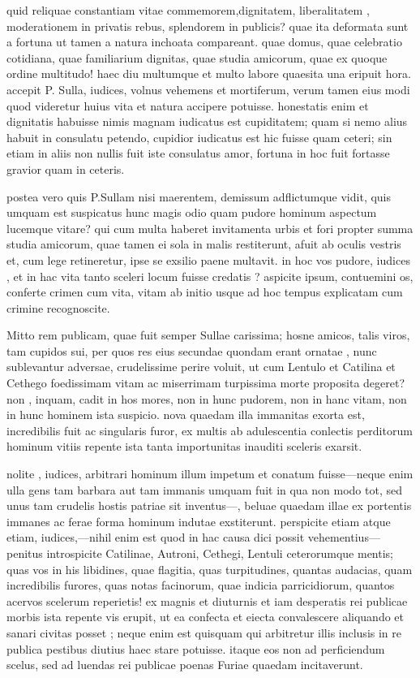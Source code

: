 quid reliquae constantiam vitae commemorem,dignitatem, liberalitatem , moderationem in privatis rebus, splendorem in publicis? quae ita deformata sunt a fortuna ut tamen a natura inchoata compareant. quae domus, quae celebratio cotidiana, quae familiarium dignitas, quae studia amicorum, quae ex quoque ordine multitudo! haec diu multumque et multo labore quaesita una eripuit hora. accepit P. Sulla, iudices, volnus vehemens et mortiferum, verum tamen eius modi quod videretur huius vita et natura accipere potuisse. honestatis enim et dignitatis habuisse nimis magnam iudicatus est cupiditatem; quam si nemo alius habuit in consulatu petendo, cupidior iudicatus est hic fuisse quam ceteri; sin etiam in aliis non nullis fuit iste consulatus amor, fortuna in hoc fuit fortasse gravior quam in ceteris.

 postea vero quis P.Sullam nisi maerentem, demissum adflictumque vidit, quis umquam est suspicatus hunc magis odio quam pudore hominum aspectum lucemque vitare? qui cum multa haberet invitamenta urbis et fori propter summa studia amicorum, quae tamen ei sola in malis restiterunt, afuit ab oculis vestris et, cum lege retineretur, ipse se exsilio paene multavit. in hoc vos pudore, iudices , et in hac vita tanto sceleri locum fuisse credatis ? aspicite ipsum, contuemini os, conferte crimen cum vita, vitam ab initio usque ad hoc tempus explicatam cum crimine recognoscite.

 Mitto rem publicam, quae fuit semper Sullae carissima; hosne amicos, talis viros, tam cupidos sui, per quos res eius secundae quondam erant ornatae , nunc sublevantur adversae, crudelissime perire voluit, ut cum Lentulo et Catilina et Cethego foedissimam vitam ac miserrimam turpissima morte proposita degeret? non , inquam, cadit in hos mores, non in hunc pudorem, non in hanc vitam, non in hunc hominem ista suspicio. nova quaedam illa immanitas exorta est, incredibilis fuit ac singularis furor, ex multis ab adulescentia conlectis perditorum hominum vitiis repente ista tanta importunitas inauditi sceleris exarsit.

 nolite , iudices, arbitrari hominum illum impetum et conatum fuisse—neque enim ulla gens tam barbara aut tam immanis umquam fuit in qua non modo tot, sed unus tam crudelis hostis patriae sit inventus—, beluae quaedam illae ex portentis immanes ac ferae forma hominum indutae exstiterunt. perspicite etiam atque etiam, iudices,—nihil enim est quod in hac causa dici possit vehementius— penitus introspicite Catilinae, Autroni, Cethegi, Lentuli ceterorumque mentis; quas vos in his libidines, quae flagitia, quas turpitudines, quantas audacias, quam incredibilis furores, quas notas facinorum, quae indicia parricidiorum, quantos acervos scelerum reperietis! ex magnis et diuturnis et iam desperatis rei publicae morbis ista repente vis erupit, ut ea confecta et eiecta convalescere aliquando et sanari civitas posset ; neque enim est quisquam qui arbitretur illis inclusis in re publica pestibus diutius haec stare potuisse. itaque eos non ad perficiendum scelus, sed ad luendas rei publicae poenas Furiae quaedam incitaverunt.

